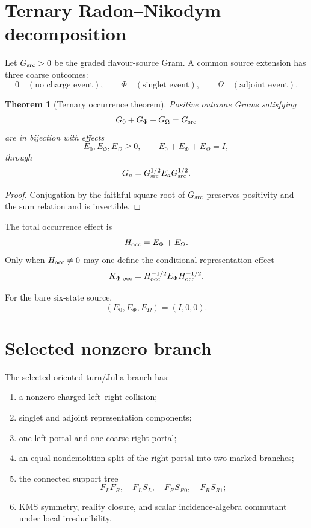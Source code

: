 \documentclass[11pt,oneside,openany]{book}
\numberwithin{equation}{chapter}
\newtheorem{theorem}{Theorem}[chapter]
\theoremstyle{definition}
\theoremstyle{remark}
\begin{document}
\section{Ternary Radon--Nikodym decomposition}

Let \(G_{\rm src}>0\) be the graded flavour-source Gram.  A common source
extension has three coarse outcomes:
\[
 0\quad(\text{no charge event}),
 \qquad
 \Phi\quad(\text{singlet event}),
 \qquad
 \Omega\quad(\text{adjoint event}).
\]

\begin{theorem}[Ternary occurrence theorem]
\label{thm:ternary-povm}
Positive outcome Grams satisfying
\[
 G_0+G_\Phi+G_\Omega=G_{\rm src}
\]
are in bijection with effects
\[
 \boxed{
 E_0,E_\Phi,E_\Omega\ge0,
 \qquad
 E_0+E_\Phi+E_\Omega=I,}
\]
through
\[
 G_a=G_{\rm src}^{1/2}E_aG_{\rm src}^{1/2}.
\]
\end{theorem}

\begin{proof}
Conjugation by the faithful square root of \(G_{\rm src}\) preserves
positivity and the sum relation and is invertible.
\end{proof}

The total occurrence effect is
\[
 H_{\rm occ}=E_\Phi+E_\Omega.
\]
Only when \(H_{\rm occ}\ne0\) may one define the conditional representation
effect
\[
 K_{\Phi\mid{\rm occ}}
 =
 H_{\rm occ}^{-1/2}E_\Phi H_{\rm occ}^{-1/2}.
\]

For the bare six-state source,
\[
 \boxed{
 (E_0,E_\Phi,E_\Omega)=(I,0,0).}
\]

\section{Selected nonzero branch}

The selected oriented-turn/Julia branch has:

\begin{enumerate}[label=\textup{(\arabic*)},leftmargin=2.2em]
\item a nonzero charged left--right collision;
\item singlet and adjoint representation components;
\item one left portal and one coarse right portal;
\item an equal nondemolition split of the right portal into two marked
      branches;
\item the connected support tree
      \[
       F_LF_R,\quad F_LS_L,\quad F_RS_{R0},\quad F_RS_{R1};
      \]
\item KMS symmetry, reality closure, and scalar incidence-algebra commutant
      under local irreducibility.
\end{enumerate}
\end{document}
